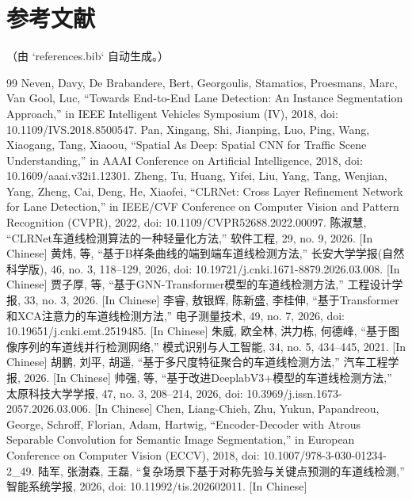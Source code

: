 \documentclass[journal]{IEEEtran}
\begin{document}
\section*{参考文献}
（由 `references.bib` 自动生成。）

\begin{thebibliography}{99}
 Neven, Davy, De Brabandere, Bert, Georgoulis, Stamatios, Proesmans, Marc, Van Gool, Luc, “Towards End-to-End Lane Detection: An Instance Segmentation Approach,” in IEEE Intelligent Vehicles Symposium (IV), 2018, doi: 10.1109/IVS.2018.8500547.
 Pan, Xingang, Shi, Jianping, Luo, Ping, Wang, Xiaogang, Tang, Xiaoou, “Spatial As Deep: Spatial CNN for Traffic Scene Understanding,” in AAAI Conference on Artificial Intelligence, 2018, doi: 10.1609/aaai.v32i1.12301.
 Zheng, Tu, Huang, Yifei, Liu, Yang, Tang, Wenjian, Yang, Zheng, Cai, Deng, He, Xiaofei, “CLRNet: Cross Layer Refinement Network for Lane Detection,” in IEEE/CVF Conference on Computer Vision and Pattern Recognition (CVPR), 2022, doi: 10.1109/CVPR52688.2022.00097.
 陈淑慧, “CLRNet车道线检测算法的一种轻量化方法,” 软件工程, 29, no. 9, 2026. [In Chinese]
 黄炜, 等, “基于B样条曲线的端到端车道线检测方法,” 长安大学学报(自然科学版), 46, no. 3, 118--129, 2026, doi: 10.19721/j.cnki.1671-8879.2026.03.008. [In Chinese]
 贾子厚, 等, “基于GNN-Transformer模型的车道线检测方法,” 工程设计学报, 33, no. 3, 2026. [In Chinese]
 李睿, 敖银辉, 陈新盛, 李桂伸, “基于Transformer和XCA注意力的车道线检测方法,” 电子测量技术, 49, no. 7, 2026, doi: 10.19651/j.cnki.emt.2519485. [In Chinese]
 朱威, 欧全林, 洪力栋, 何德峰, “基于图像序列的车道线并行检测网络,” 模式识别与人工智能, 34, no. 5, 434--445, 2021. [In Chinese]
 胡鹏, 刘平, 胡遥, “基于多尺度特征聚合的车道线检测方法,” 汽车工程学报, 2026. [In Chinese]
 帅强, 等, “基于改进DeeplabV3+模型的车道线检测方法,” 太原科技大学学报, 47, no. 3, 208--214, 2026, doi: 10.3969/j.issn.1673-2057.2026.03.006. [In Chinese]
 Chen, Liang-Chieh, Zhu, Yukun, Papandreou, George, Schroff, Florian, Adam, Hartwig, “Encoder-Decoder with Atrous Separable Convolution for Semantic Image Segmentation,” in European Conference on Computer Vision (ECCV), 2018, doi: 10.1007/978-3-030-01234-2_49.
 陆军, 张澍森, 王磊, “复杂场景下基于对称先验与关键点预测的车道线检测,” 智能系统学报, 2026, doi: 10.11992/tis.202602011. [In Chinese]

\end{thebibliography}
\end{document}
